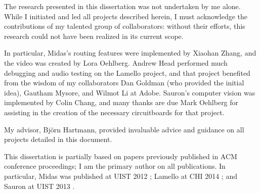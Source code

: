 The research presented in this dissertation was not undertaken by me alone. While I initiated
and led all projects described herein, I must acknowledge the contributions of my talented group of collaborators: without their efforts, this research could not have been realized in its current scope.

In particular, Midas's routing features were implemented by Xiaohan Zhang, and the video was created by Lora Oehlberg. Andrew Head performed much debugging and audio testing on the Lamello project, and that project benefited from the wisdom of my collaborators Dan Goldman (who provided the initial idea), Gautham Mysore, and Wilmot Li at Adobe. Sauron's computer vision was implemented by Colin Chang, and many thanks are due Mark Oehlberg for assisting in the creation of the necessary circuitboards for that project.

My advisor, Bj\"orn Hartmann, provided invaluable advice and guidance on all projects detailed in this document.

This dissertation is partially based on papers previously published in ACM conference proceedings; I am the primary author on all publications. In particular, Midas was published at UIST 2012 \cite{savage-midas}; Lamello at CHI 2014 \cite{savage-lamello}; and Sauron at UIST 2013 \cite{savage-sauron}.
